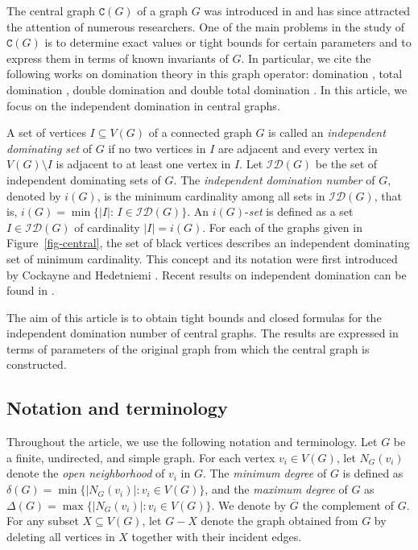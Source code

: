 \documentclass[12pt]{article}
\begin{document}
\vspace{.1cm}

\noindent
The central graph $\mathtt{C}(G)$ of a graph $G$ was introduced in \cite{Vernold} and has since attracted the attention of numerous researchers. One of the main problems in the study of $\mathtt{C}(G)$ is to determine exact values or tight bounds for certain parameters and to express them in terms of known invariants of $G$. In particular, we cite the following works on domination
theory in this graph operator: domination \cite{BFKB2026}, total domination \cite{KM2019}, double domination \cite{CRS2026} and double total domination \cite{RCRS2026}. In this article, we focus on the independent domination in central graphs.

\vspace{.1cm}

\noindent
A set of vertices $I\subseteq V(G)$ of a connected graph $G$ is called an \emph{independent dominating set} of $G$ if no two vertices in $I$ are adjacent and every vertex in $V(G)\setminus I$ is adjacent to at least one vertex in $I$. Let $\mathcal{ID}(G)$ be the set of independent dominating sets of $G$. The \emph{independent domination number} of $G$, denoted by $i(G)$, is the minimum cardinality among all sets in $\mathcal{ID}(G)$, that is, $i(G)=\min\{|I|:\, I\in \mathcal{ID}(G)\}.$ 
An $i(G)$-\emph{set} is defined as a set $I\in \mathcal{ID}(G)$ of cardinality $|I|=i(G)$. For each of the graphs given in Figure~\ref{fig-central}, the set of black vertices describes an independent dominating set of minimum cardinality. This concept and its notation were first introduced by Cockayne and Hedetniemi \cite{ind-1,ind-2}. Recent results on independent domination can be found in \cite{IndDom-2022,IndDom-2019,Cabrera2023,CR2024,CCP2023,IndDom-2017,IndDom-2022-1}.

\vspace{.1cm}

\noindent
The aim of this article is to obtain tight bounds and closed formulas for the independent domination number of central graphs. The results are expressed in terms of parameters of the original graph from which the central graph is constructed. 

\subsection{Notation and terminology}
Throughout the article, we use the following notation and terminology. Let $G$ be a finite, undirected, and simple graph. For each vertex $v_i\in V(G)$, let $N_G(v_i)$ denote the \emph{open neighborhood} of $v_i$ in $G$. The \emph{minimum degree} of $G$ is defined as $\delta(G)=\min\{|N_G(v_i)|: v_i\in V(G)\}$, and the \emph{maximum degree} of $G$ as $\Delta(G)=\max\{|N_G(v_i)|: v_i\in V(G)\}$. We denote
by $\overline{G}$ the complement of $G$. For any subset $X\subseteq V(G)$, let $G-X$ denote the graph obtained from $G$ by deleting all vertices in $X$ together with their incident edges. 
\end{document}
